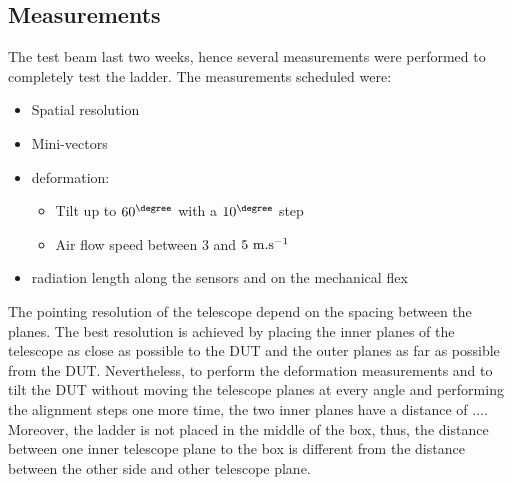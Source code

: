     \subsection{Measurements}

    The test beam last two weeks, hence several measurements were performed to completely test the ladder.
    The measurements scheduled were: 
    \begin{itemize}
      \item Spatial resolution
      \item Mini-vectors
      \item deformation:
      \begin{itemize}
        \item Tilt up to $60^{\degree}$ with a $10^{\degree}$ step
        \item Air flow speed between 3 and $5~\rm{m.s}^{-1}$
      \end{itemize}
      \item radiation length along the sensors and on the mechanical flex
    \end{itemize}

    The pointing resolution of the telescope depend on the spacing between the planes. 
    The best resolution is achieved by placing the inner planes of the telescope as close as possible to the \gls{DUT} and the outer planes as far as possible from the \gls{DUT}.
    Nevertheless, to perform the deformation measurements and to tilt the \gls{DUT} without moving the telescope planes at every angle and performing the alignment steps one more time, the two inner planes have a distance of ....
    Moreover, the ladder is not placed in the middle of the box, thus, the distance between one inner telescope plane to the box is different from the distance between the other side and other telescope plane.

